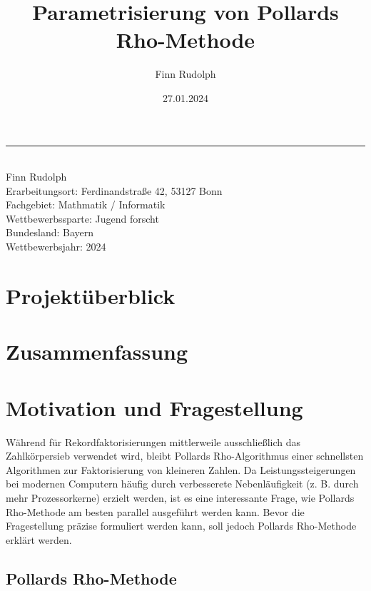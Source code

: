 \documentclass[a4paper, 10pt, ngerman]{article}
\title{Parametrisierung von Pollards Rho-Methode}
\author{Finn Rudolph}
\date{27.01.2024}
\begin{document}
\noindent\rule{\textwidth}{0.4pt}

\makeatletter
\begin{flushleft}
    \textbf{\LARGE{\@title}} \\
    \vspace{1.5em}
    Finn Rudolph \\
    \vspace{1em}
    Erarbeitungsort: Ferdinandstraße 42, 53127 Bonn \\
    Fachgebiet: Mathmatik / Informatik \\
    Wettbewerbssparte: Jugend forscht \\
    Bundesland: Bayern \\
    Wettbewerbsjahr: 2024
\end{flushleft}

\vspace{0.5em}

\section*{Projektüberblick}

\tableofcontents

\section{Zusammenfassung}

\section{Motivation und Fragestellung}

Während für Rekordfaktorisierungen mittlerweile ausschließlich das Zahlkörpersieb verwendet wird, bleibt Pollards Rho-Algorithmus einer schnellsten Algorithmen zur Faktorisierung von kleineren Zahlen. Da Leistungssteigerungen bei modernen Computern häufig durch verbesserete Nebenläufigkeit (z. B. durch mehr Prozessorkerne) erzielt werden, ist es eine interessante Frage, wie Pollards Rho-Methode am besten parallel ausgeführt werden kann. Bevor die Fragestellung präzise formuliert werden kann, soll jedoch Pollards Rho-Methode erklärt werden.

\subsection{Pollards Rho-Methode}
\end{document}
